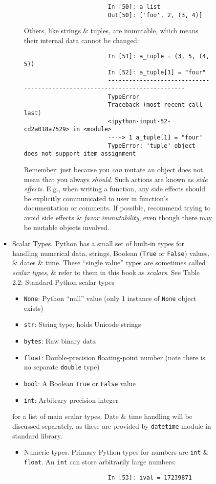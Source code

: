 \documentclass{article}
\begin{document}
\begin{enumerate}
\begin{itemize}
\begin{itemize}
\begin{itemize}
\begin{itemize}
\begin{verbatim}
						In [50]: a_list
						Out[50]: ['foo', 2, (3, 4)]
					\end{verbatim}
					Others, like strings \& tuples, are immutable, which means their internal data cannot be changed:
					\begin{verbatim}
						In [51]: a_tuple = (3, 5, (4, 5))
						In [52]: a_tuple[1] = "four"
						---------------------------------------------------------------------------
						TypeError
						Traceback (most recent call last)
						<ipython-input-52-cd2a018a7529> in <module>
						----> 1 a_tuple[1] = "four"
						TypeError: 'tuple' object does not support item assignment
					\end{verbatim}
					Remember: just because you {\it can} mutate an object does not mean that you always {\it should}. Such actions are known as {\it side effects}. E.g., when writing a function, any side effects should be explicitly communicated to user in function's documentation or comments. If possible, recommend trying to avoid side effects \& {\it favor immutability}, even though there may be mutable objects involved.
				\end{itemize}
				\item {\sc Scalar Types.} Python has a small set of built-in types for handling numerical data, strings, Boolean ({\tt True} or {\tt False}) values, \& dates \& time. These ``single value'' types are sometimes called {\it scalar types}, \& refer to them in this book as {\it scalars}. See {\sf Table 2.2: Standard Python scalar types}
				\begin{itemize}
					\item {\tt None}: Python ``null'' value (only 1 instance of {\tt None} object exists)
					\item {\tt str}: String type; holds Unicode strings
					\item {\tt bytes}: Raw binary data
					\item {\tt float}: Double-precision floating-point number (note there is no separate {\tt double} type)
					\item {\tt bool}: A Boolean {\tt True} or {\tt False} value
					\item {\tt int}: Arbitrary precision integer
				\end{itemize}
				for a list of main scalar types. Date \& time handling will be discussed separately, as these are provided by {\tt datetime} module in standard library.
				\begin{itemize}
					\item {\sf Numeric types.} Primary Python types for numbers are {\tt int} \& {\tt float}. An {\tt int} can store arbitrarily large numbers:
					\begin{verbatim}
						In [53]: ival = 17239871
						

\end{verbatim}
\end{itemize}
\end{itemize}
\end{itemize}
\end{itemize}
\end{enumerate}
\end{document}
